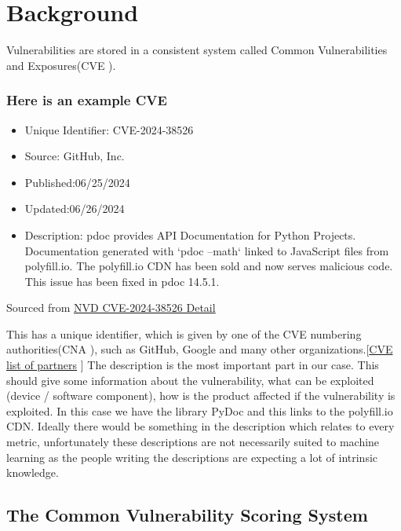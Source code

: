 \documentclass[12pt]{article}
\begin{document}
\section{Background}

Vulnerabilities are stored in a consistent system called Common Vulnerabilities and
Exposures(CVE \cite{CVE}).

\subsubsection*{Here is an example CVE}
\begin{itemize}
	\item   Unique Identifier: CVE-2024-38526
	\item   Source: GitHub, Inc.
	\item   Published:06/25/2024
	\item   Updated:06/26/2024

	\item   Description: pdoc provides API Documentation for Python Projects. Documentation
	      generated with `pdoc --math` linked to JavaScript files from polyfill.io. The polyfill.io
	      CDN has been sold and now serves malicious code. This issue has been fixed in pdoc 14.5.1.

\end{itemize}

\footnotesize{Sourced from \href{https://nvd.nist.gov/vuln/detail/CVE-2024-38526}{NVD CVE-2024-38526
		Detail} \cite{polyfill}} \\
\bigskip

This has a unique identifier, which is given by one of the CVE numbering authorities(CNA \cite{CNA}), such as
GitHub, Google and many other
organizations.[\href{https://www.cve.org/PartnerInformation/ListofPartners}{CVE list of
			partners} \cite{partners}]
The description is the most important part in our case. This should give some information about the
vulnerability, what can be exploited (device / software component), how is the product affected if
the vulnerability is exploited. In this case we have the library PyDoc and this links to the
polyfill.io CDN. Ideally there would be something in the description which relates to every metric,
unfortunately these descriptions are not necessarily suited to machine learning as the people
writing the descriptions are expecting a lot of intrinsic knowledge.

\subsection*{The Common Vulnerability Scoring System}
\end{document}
